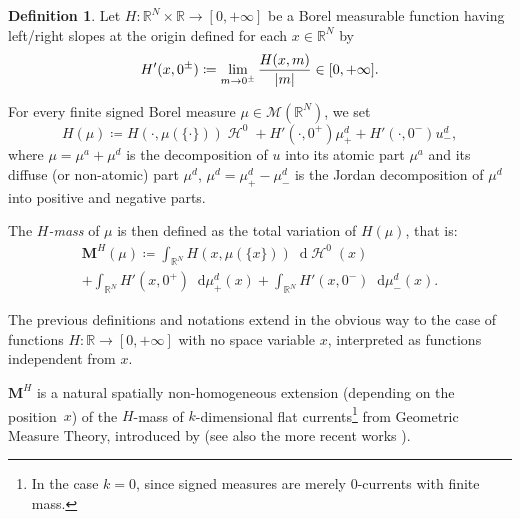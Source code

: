 \documentclass[JEP,XML,SOM,Unicode,published]{cedram}
\theoremstyle{plain}
\theoremstyle{definition}
\newtheorem{definition}[theorem]{Definition}
\newcommand{\dd}{\mathop{}\mathopen{}\mathrm{d}}
\newcommand{\R}{\mathbb{R}}
\newcommand{\Mspace}{\mathscr{M}}
\newcommand{\mass}{\boldsymbol{M}}
\DeclarePairedDelimiter{\abs}{\lvert}{\rvert}
\DeclareMathOperator{\hdm}{\mathcal{H}}
\begin{document}
\label{sectionHmass}

\begin{definition}\label{defHmass}
Let \(H:\R^N\times\R\to[0,+\infty]\) be a Borel measurable function having left/right slopes at the origin defined for each $x\in\R^N$ by
\begin{equation}
\label{slopeDefinition}
H'(x,0^\pm)\coloneqq\lim_{m\to 0^\pm}\frac{H(x,m)}{\abs{m}} \in [0,+\infty].
\end{equation}

For every finite signed Borel measure \(\mu\in \Mspace(\R^N)\), we set
\[
H(\mu)\coloneqq H(\cdot,\mu(\{\cdot\}))\hdm^0+H'(\cdot,0^+) \mu^d_++H'(\cdot,0^-) u^d_-,
\]
where \(\mu = \mu^a+\mu^d\) is the decomposition of $u$ into its atomic part $\mu^a$ and its diffuse (or non-atomic) part $\mu^d$, $\mu^d=\mu^d_+-\mu^d_-$ is the Jordan decomposition of $\mu^d$ into positive and negative parts.

The \emph{$H$-mass} of $\mu$ is then defined as the total variation of $H(\mu)$, that is:
\begin{multline*}
\mass^H(\mu)\coloneqq \int_{\R^N} H(x,\mu(\{x\})) \dd\hdm^0(x)\\
+ \int_{\R^N} H'(x,0^+) \dd \mu^d_+(x) + \int_{\R^N} H'(x,0^-) \dd \mu^d_-(x).
\end{multline*}
\end{definition}
The previous definitions and notations extend in the obvious way to the case of functions \(H:\R\to[0,+\infty]\) with no space variable \(x\), interpreted as functions independent from \(x\).

\(\mass^H\) is a natural spatially non-homogeneous extension (depending on the position~$x$) of the $H$-mass of $k$-dimensional flat currents\footnote{In the case $k=0$, since signed measures are merely $0$-currents with finite mass.} from Geometric Measure Theory, introduced by \cite{flemingFlatChainsFinite1966} (see also the more recent works \cite{depauwSizeMinimizationApproximating2003,colomboLowerSemicontinuousEnvelope2017}).
\end{document}

